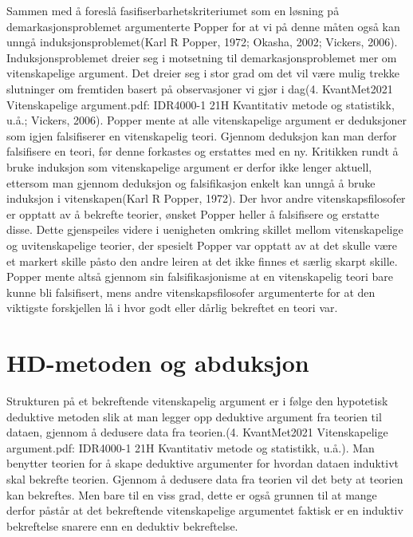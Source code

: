 \documentclass[
]{book}
\begin{document}
Sammen med å foreslå fasifiserbarhetskriteriumet som en løsning på demarkasjonsproblemet argumenterte Popper for at vi på denne måten også kan unngå induksjonsproblemet(Karl R Popper, 1972; Okasha, 2002; Vickers, 2006). Induksjonsproblemet dreier seg i motsetning til demarkasjonsproblemet mer om vitenskapelige argument. Det dreier seg i stor grad om det vil være mulig trekke slutninger om fremtiden basert på observasjoner vi gjør i dag(4. KvantMet2021 Vitenskapelige argument.pdf: IDR4000-1 21H Kvantitativ metode og statistikk, u.å.; Vickers, 2006). Popper mente at alle vitenskapelige argument er deduksjoner som igjen falsifiserer en vitenskapelig teori. Gjennom deduksjon kan man derfor falsifisere en teori, før denne forkastes og erstattes med en ny. Kritikken rundt å bruke induksjon som vitenskapelige argument er derfor ikke lenger aktuell, ettersom man gjennom deduksjon og falsifikasjon enkelt kan unngå å bruke induksjon i vitenskapen(Karl R Popper, 1972). Der hvor andre vitenskapsfilosofer er opptatt av å bekrefte teorier, ønsket Popper heller å falsifisere og erstatte disse. Dette gjenspeiles videre i uenigheten omkring skillet mellom vitenskapelige og uvitenskapelige teorier, der spesielt Popper var opptatt av at det skulle være et markert skille påsto den andre leiren at det ikke finnes et særlig skarpt skille. Popper mente altså gjennom sin falsifikasjonisme at en vitenskapelig teori bare kunne bli falsifisert, mens andre vitenskapsfilosofer argumenterte for at den viktigste forskjellen lå i hvor godt eller dårlig bekreftet en teori var.

\hypertarget{hd-metoden-og-abduksjon}{%
\section{HD-metoden og abduksjon}\label{hd-metoden-og-abduksjon}}

Strukturen på et bekreftende vitenskapelig argument er i følge den hypotetisk deduktive metoden slik at man legger opp deduktive argument fra teorien til dataen, gjennom å dedusere data fra teorien.(4. KvantMet2021 Vitenskapelige argument.pdf: IDR4000-1 21H Kvantitativ metode og statistikk, u.å.). Man benytter teorien for å skape deduktive argumenter for hvordan dataen induktivt skal bekrefte teorien. Gjennom å dedusere data fra teorien vil det bety at teorien kan bekreftes. Men bare til en viss grad, dette er også grunnen til at mange derfor påstår at det bekreftende vitenskapelige argumentet faktisk er en induktiv bekreftelse snarere enn en deduktiv bekreftelse.
\end{document}
